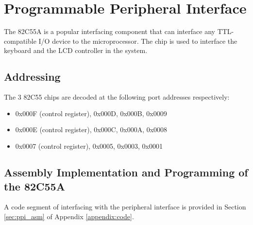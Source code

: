 \section{Programmable Peripheral Interface}
The 82C55A is a popular interfacing component that can interface any TTL-compatible I/O device to the microprocessor. The chip is used to interface the keyboard and the LCD controller in the system.

    \subsection{Addressing}
    The 3 82C55 chips are decoded at the following port addresses respectively:

        \begin{itemize}

            \item 0x000F (control register), 0x000D, 0x000B, 0x0009

            \item 0x000E (control register), 0x000C, 0x000A, 0x0008

            \item 0x0007 (control register), 0x0005, 0x0003, 0x0001

        \end{itemize}

    \subsection{Assembly Implementation and Programming of the 82C55A}
    A code segment of interfacing with the peripheral interface is provided in Section \ref{sec:ppi_asm} of Appendix \ref{appendix:code}.

